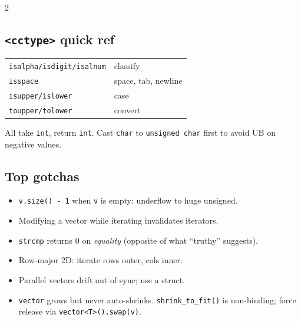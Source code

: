 \documentclass[10pt]{article}
\begin{document}
\begin{multicols}{2}
\subsection*{\texttt{<cctype>} quick ref}
\begin{tabular}{@{}ll@{}}
\texttt{isalpha/isdigit/isalnum} & classify\\
\texttt{isspace}                 & space, tab, newline\\
\texttt{isupper/islower}         & case\\
\texttt{toupper/tolower}         & convert
\end{tabular}
All take \texttt{int}, return \texttt{int}. Cast \texttt{char} to
\texttt{unsigned char} first to avoid UB on negative values.

\subsection*{Top gotchas}
\begin{itemize}
    \item \texttt{v.size() - 1} when \texttt{v} is empty: underflow
    to huge unsigned.
    \item Modifying a vector while iterating invalidates iterators.
    \item \texttt{strcmp} returns 0 on \emph{equality} (opposite of
    what ``truthy'' suggests).
    \item Row-major 2D: iterate rows outer, cols inner.
    \item Parallel vectors drift out of sync; use a struct.
    \item \texttt{vector} grows but never auto-shrinks. \texttt{shrink\_to\_fit()}
    is non-binding; force release via \texttt{vector<T>().swap(v)}.
\end{itemize}

\end{multicols}
\end{document}

